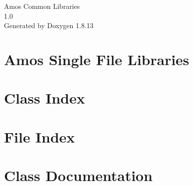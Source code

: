 \documentclass[twoside]{book}
\newcommand{\+}{\discretionary{\mbox{\scriptsize$\hookleftarrow$}}{}{}}
\newcommand{\clearemptydoublepage}{%
  \newpage{\pagestyle{empty}\cleardoublepage}%
}
\begin{document}
\hypersetup{pageanchor=false,
             bookmarksnumbered=true,
             pdfencoding=unicode
            }
\begin{titlepage}
\vspace*{7cm}
\begin{center}%
{\Large Amos\textquotesingle{} Common Libraries \\[1ex]\large 1.\+0 }\\
\vspace*{1cm}
{\large Generated by Doxygen 1.8.13}\\
\end{center}
\end{titlepage}
\clearemptydoublepage
{}
\tableofcontents
\clearemptydoublepage
{}
\hypersetup{pageanchor=true}

\chapter{Amos Single File Libraries}
\label{index}\hypertarget{index}{}
\chapter{Class Index}

\chapter{File Index}

\chapter{Class Documentation}










































\end{document}
